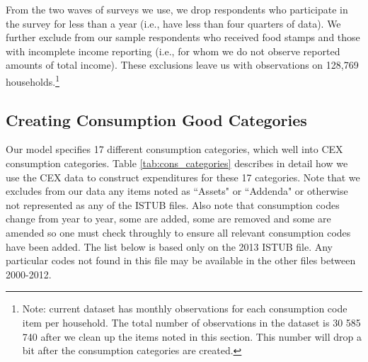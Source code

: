 \documentclass[article,11pt,letterpaper,fleqn]{article}
\theoremstyle{definition}
\numberwithin{equation}{section}
\begin{document}
From the two waves of surveys we use, we drop respondents who participate in the survey for less than a year (i.e., have less than four quarters of data).  We further exclude from our sample respondents who received food stamps and those with incomplete income reporting (i.e., for whom we do not observe reported amounts of total income).  These exclusions leave us with observations on 128,769 households.\footnote{Note: current dataset has monthly observations for each consumption code item per household. The total number of observations in the dataset is 30 585 740 after we clean up the items noted in this section. This number will drop a bit after the consumption categories are created.}

\subsection{Creating Consumption Good Categories}

Our model specifies 17 different consumption categories, which well into CEX consumption categories.  Table \ref{tab:cons_categories} describes in detail how we use the CEX data to construct expenditures for these 17 categories.  Note that we excludes  from our data any items noted as ``Assets" or ``Addenda" or otherwise not represented as any of the ISTUB files.    Also note that consumption codes change from year to year, some are added, some are removed and some are amended so one must check throughly to ensure  all relevant consumption codes have been added. The list below is based only on the 2013 ISTUB file. Any particular codes not found in this file may be available in the other files between 2000-2012. 
\end{document}
